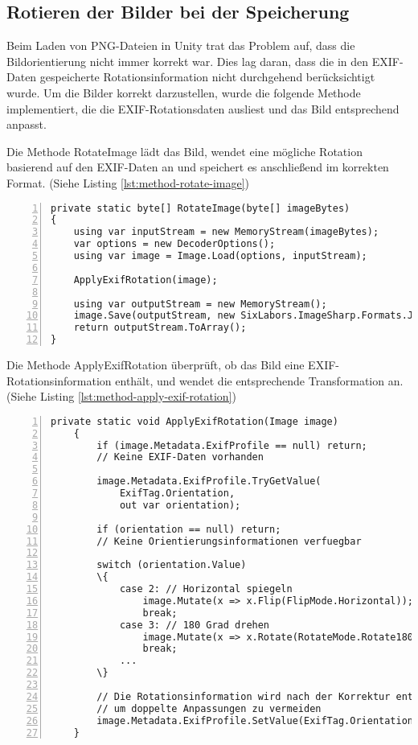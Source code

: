 \subsection{Rotieren der Bilder bei der Speicherung}

Beim Laden von PNG-Dateien in Unity trat das Problem auf, dass die Bildorientierung 
nicht immer korrekt war. Dies lag daran, dass die in den EXIF-Daten gespeicherte 
Rotationsinformation nicht durchgehend berücksichtigt wurde. Um die Bilder 
korrekt darzustellen, wurde die folgende Methode implementiert, die die 
EXIF-Rotationsdaten ausliest und das Bild entsprechend anpasst.

Die Methode RotateImage lädt das Bild, wendet eine mögliche Rotation 
basierend auf den EXIF-Daten an und speichert es anschlie\ss{}end im korrekten Format. 
(Siehe Listing \ref{lst:method-rotate-image})

\begin{lstlisting}[numbers=left,caption={Methode RotateImage},label={lst:method-rotate-image}]
private static byte[] RotateImage(byte[] imageBytes)
{
    using var inputStream = new MemoryStream(imageBytes);
    var options = new DecoderOptions();
    using var image = Image.Load(options, inputStream);
        
    ApplyExifRotation(image);
    
    using var outputStream = new MemoryStream();
    image.Save(outputStream, new SixLabors.ImageSharp.Formats.Jpeg.JpegEncoder());
    return outputStream.ToArray();
}    
\end{lstlisting}

Die Methode ApplyExifRotation überprüft, ob das Bild eine EXIF-Rotationsinformation enthält, 
und wendet die entsprechende Transformation an. 
(Siehe Listing \ref{lst:method-apply-exif-rotation})

\begin{lstlisting}[numbers=left,caption={Methode ApplyExifRotation},label={lst:method-apply-exif-rotation}]
    private static void ApplyExifRotation(Image image)
    {
        if (image.Metadata.ExifProfile == null) return; 
        // Keine EXIF-Daten vorhanden
                
        image.Metadata.ExifProfile.TryGetValue(
            ExifTag.Orientation, 
            out var orientation);
            
        if (orientation == null) return; 
        // Keine Orientierungsinformationen verfuegbar
            
        switch (orientation.Value)
        \{
            case 2: // Horizontal spiegeln
                image.Mutate(x => x.Flip(FlipMode.Horizontal));
                break;
            case 3: // 180 Grad drehen
                image.Mutate(x => x.Rotate(RotateMode.Rotate180));
                break;
            ...
        \}
            
        // Die Rotationsinformation wird nach der Korrektur entfernt, 
        // um doppelte Anpassungen zu vermeiden
        image.Metadata.ExifProfile.SetValue(ExifTag.Orientation, (ushort)1);
    }    
\end{lstlisting}

